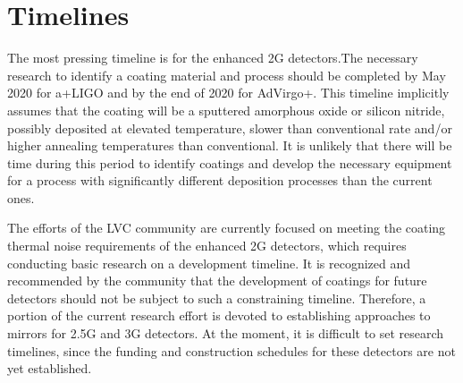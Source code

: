 \section{Timelines}

The most pressing timeline is for the enhanced \ac{2G} detectors.The necessary research to identify a coating material and process should be completed by May 2020 for \ac{a+LIGO} and by the end of 2020 for \ac{AdVirgo+}. This timeline implicitly assumes that the coating will be a sputtered amorphous oxide or silicon nitride, possibly deposited at elevated temperature, slower than conventional rate and/or higher annealing temperatures than conventional. It is unlikely that there will be time during this period to identify coatings and develop the necessary equipment for a process with significantly different deposition processes than the current ones.


The efforts of the \ac{LVC} community are currently focused on meeting the coating thermal noise requirements of the enhanced \ac{2G} detectors, which requires conducting basic research on a development timeline. It is recognized and recommended by the community that the development of coatings for future detectors should not be subject to such a constraining timeline. Therefore, a portion of the current research effort is devoted to establishing approaches to mirrors for \ac{2.5G} and \ac{3G} detectors. At the moment, it is difficult to set research timelines, since the funding and construction schedules for these detectors are not yet established.

